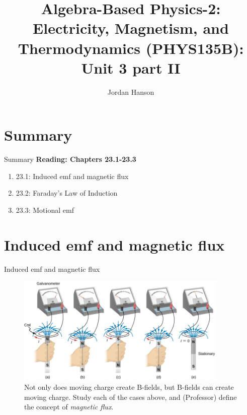 \documentclass{beamer}
\title{Algebra-Based Physics-2: Electricity, Magnetism, and Thermodynamics (PHYS135B): Unit 3 part II}
\author{Jordan Hanson}
\institute{Whittier College Department of Physics and Astronomy}
\begin{document}
\maketitle

\section{Summary}

\begin{frame}{Summary}
\textbf{Reading: Chapters 23.1-23.3} \\ \vspace{0.5cm}
\begin{enumerate}
\item 23.1: Induced emf and magnetic flux
\item 23.2: Faraday's Law of Induction
\item 23.3: Motional emf
\end{enumerate}
\end{frame}

\section{Induced emf and magnetic flux}

\begin{frame}{Induced emf and magnetic flux}
\begin{figure}
\centering
\includegraphics[width=0.9\textwidth]{figures/farad.png}
\caption{\label{fig:farad1} Not only does moving charge create B-fields, but B-fields can create moving charge.  Study each of the cases above, and (Professor) define the concept of \textit{magnetic flux}.}
\end{figure}
\end{frame}
\end{document}
